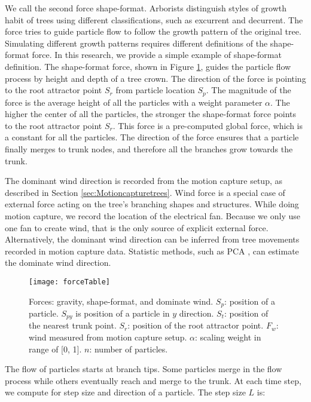 We call the second force shape-format. Arborists distinguish styles of growth habit of trees using different classifications, such as excurrent and decurrent. The force tries to guide particle flow to follow the growth pattern of the original tree. Simulating different growth patterns requires different definitions of the shape-format force. In this research, we provide a simple example of shape-format definition. The shape-format force, shown in Figure \ref{fig:forceTable}, guides the particle flow process by height and depth of a tree crown. The direction of the force is pointing to the root attractor point $S_r$ from particle location $S_p$. The magnitude of the force is the average height of all the particles with a weight parameter $\alpha$. The higher the center of all the particles, the stronger the shape-format force points to the root attractor point $S_r$. This force is a pre-computed global force, which is a constant for all the particles. The direction of the force ensures that a particle finally merges to trunk nodes, and therefore all the branches grow towards the trunk.

The dominant wind direction is recorded from the motion capture setup, as described in Section \ref{sec:Motioncapturetrees}. Wind force is a special case of external force acting on the tree's branching shapes and structures. While doing motion capture, we record the location of the electrical fan. Because we only use one fan to create wind, that is the only source of explicit external force. Alternatively, the dominant wind direction can be inferred from tree movements recorded in motion capture data. Statistic methods, such as PCA , can estimate the dominate wind direction.

\begin{figure}[!t]
\centering
\texttt{[image: forceTable]}
\caption[Definition of three forces. ]{Forces: gravity, shape-format, and dominate wind. 
$S_p$: position of a particle. $S_{py}$ is position of a particle in $y$ direction.
$S_t$: position of the nearest trunk point.
$S_r$: position of the root attractor point.
$F_w$: wind measured from motion capture setup.
$\alpha$: scaling weight in range of [0, 1].
$n$: number of particles.
}
\label{fig:forceTable}
\end{figure}

The flow of particles starts at branch tips. Some particles merge in the flow process while others eventually reach and merge to the trunk. At each time step, we compute for step size and direction of a particle. The step size $L$ is:

